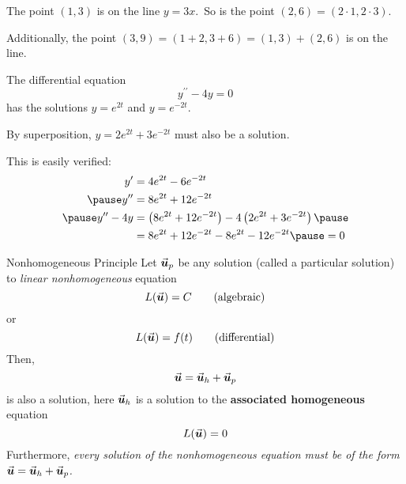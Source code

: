 \documentclass{beamer}
\begin{document}
\begin{frame}
\begin{example}
The point $(1,3)$ is on the line $y=3x$.\pause~So is the point $(2,6) = (2\cdot 1, 2\cdot 3)$.

\vspace{2mm}\pause
Additionally, the point $(3,9)=(1+2,3+6)=(1,3)+(2,6)$ is on the line.
\end{example}\pause

\begin{example}
The differential equation
\begin{equation*}
y^{\prime\prime}-4y=0
\end{equation*}
has the solutions $y=e^{2t}$ and $y=e^{-2t}$.\pause

\vspace{2mm}
By superposition, $y=2e^{2t}+3e^{-2t}$ must also be a solution.\pause

\vspace{2mm}
This is easily verified:
\begin{equation*}
\begin{aligned}
y^\prime &= 4e^{2t}-6e^{-2t} \\\pause
y^{\prime\prime} &= 8e^{2t}+12e^{-2t} \\\pause
y^{\prime\prime}-4y &= \left(8e^{2t}+12e^{-2t}\right) -4\left(2e^{2t}+3e^{-2t}\right)\pause \\
& = 8e^{2t}+12e^{-2t} -8e^{2t}-12e^{-2t}\pause = 0
\end{aligned}
\end{equation*}
\end{example}
\end{frame}

\begin{frame}
\begin{block}{Nonhomogeneous Principle}
Let ${\vec{\boldsymbol{u}}}_p$ be any solution (called a particular solution) to \emph{linear nonhomogeneous} equation
\begin{equation*}
L({\vec{\boldsymbol{u}}})=C\qquad\text{(algebraic)} 
\end{equation*}
or
\begin{equation*}
L({\vec{\boldsymbol{u}}})=f(t)\qquad\text{(differential)}
\end{equation*}
Then,
\begin{equation*}
{\vec{\boldsymbol{u}}}={\vec{\boldsymbol{u}}}_h+{\vec{\boldsymbol{u}}}_p
\end{equation*}
is also a solution, here ${\vec{\boldsymbol{u}}}_h$ is a solution to the \textbf{associated homogeneous} equation
\begin{equation*}
L({\vec{\boldsymbol{u}}})=0
\end{equation*}
Furthermore, \emph{every solution of the nonhomogeneous equation must be of the form ${\vec{\boldsymbol{u}}}={\vec{\boldsymbol{u}}}_h+{\vec{\boldsymbol{u}}}_p$.}
\end{block}
\end{frame}
\end{document}
